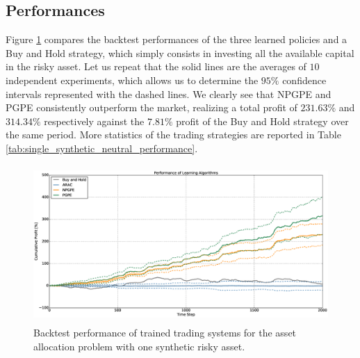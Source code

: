 \subsection{Performances}
Figure \ref{fig:single_synthetic_neutral_performance} compares the backtest performances of the three learned policies and a Buy and Hold strategy, which simply consists in investing all the available capital in the risky asset. Let us repeat that the solid lines are the averages of $10$ independent experiments, which allows us to determine the $95\%$ confidence intervals represented with the dashed lines. We clearly see that NPGPE and PGPE consistently outperform the market, realizing a total profit of $231.63\%$ and $314.34\%$ respectively against the $7.81\%$ profit of the Buy and Hold strategy over the same period. More statistics of the trading strategies are reported in Table \ref{tab:single_synthetic_neutral_performance}.
\begin{figure}[t]
	\centering
	\includegraphics[height=6cm,width=1.0\textwidth]{Images/6_1_single_synthetic_neutral_performance}
	\caption[Backtest performance with one synthetic risky asset]{Backtest performance of trained trading systems for the asset allocation problem with one synthetic risky asset.}
	\label{fig:single_synthetic_neutral_performance}
\end{figure}
